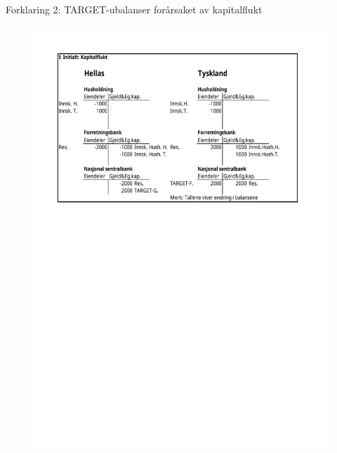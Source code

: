 \documentclass[notes=show notes]{beamer}
\begin{document}
\begin{frame}{Forklaring 2: TARGET-ubalanser for\aa rsaket av kapitalflukt}
\begin{figure}
\centering
\includegraphics[width=0.9\linewidth]{Fork2_delI}
\label{fig:Fork1_delII}
\end{figure}
\end{frame}
\end{document}
